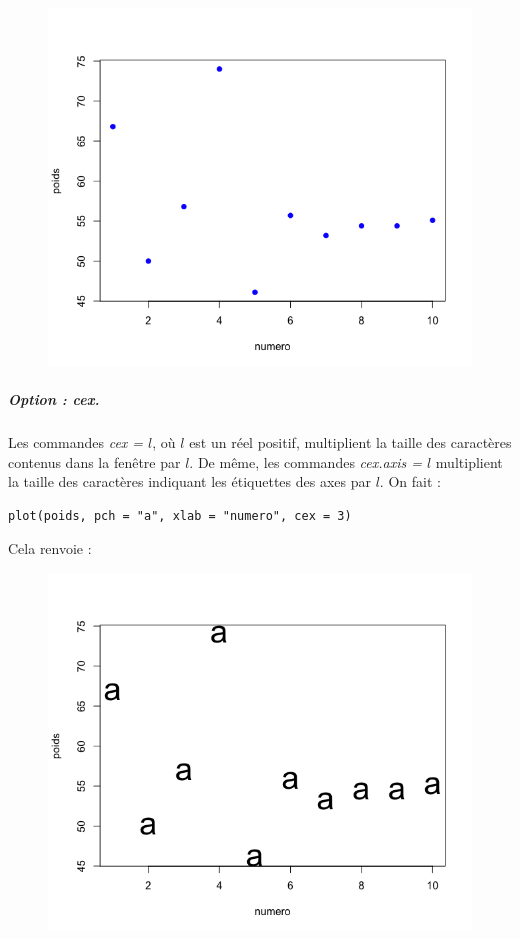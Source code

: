 \begin{itemize}
\begin{figure}[H]\begin{center}\includegraphics[scale=0.4]{ilu/gra19.png}\end{center}\end{figure}
\end{itemize}
\subparagraph{Option : cex.} 
Les commandes \textit{cex = $l$}, où $l$ est un réel positif, multiplient la taille des caractères contenus dans la fenêtre par $l$. De même, les commandes \textit{cex.axis = $l$} multiplient la taille des caractères indiquant les étiquettes des axes par $l$.\newline
On fait :
\begin{lstlisting}[language=html]
plot(poids, pch = "a", xlab = "numero", cex = 3)
\end{lstlisting}
Cela renvoie :
\begin{figure}[H]\begin{center}\includegraphics[scale=0.4]{ilu/gra20.png}\end{center}\end{figure}
